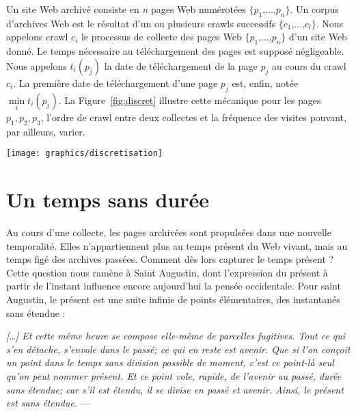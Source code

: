 \documentclass[symmetric,justified,marginals=raggedouter]{tufte-book}
\begin{document}
Un site Web archivé consiste en \textit{n} pages Web numérotées $\{p_1$,...,$p_n\}$. Un corpus d'archives Web est le résultat d'un ou plusieurs crawls successifs $\{c_1$,...,$c_l\}$. Nous appelons crawl $c_i$ le processus de collecte des pages Web $\{p_1$,...,$p_n\}$ d'un site Web donné. Le temps nécessaire au téléchargement des pages est supposé négligeable. Nous appelons $t_i(p_j)$ la date de téléchargement de la page $p_j$ au cours du crawl $c_i$. La première date de téléchargement d'une page $p_j$ est, enfin, notée $\min\limits_{i} t_i(p_j)$. La Figure~\ref{fig:discret} illustre cette mécanique pour les pages $p_1, p_2, p_3$, l'ordre de crawl entre deux collectes et la fréquence des visites pouvant, par ailleurs, varier. 

\begin{figure*}%
  \texttt{[image: graphics/discretisation]}
  \caption{Archivage (cercles bleus) des pages $p_1, p_2, p_3$ au cours de deux crawls $c_1, c_2$}
  \label{fig:discret}
\end{figure*}

\section{Un temps sans durée}
\label{sec:4_temporalite}

\noindent Au cours d'une collecte, les pages archivées sont propulsées dans une nouvelle temporalité. Elles n'ap\-partiennent plus au temps présent du Web vivant, mais au temps figé des archives passées. Comment dès lors capturer le temps présent ? Cette question nous ramène à Saint Augustin, dont l'expression du  présent à partir de l'instant influence encore aujourd'hui la pensée occidentale. Pour saint Augustin, le présent est une suite infinie de points élémentaires, des instantanés sans étendue :\\ 

\begin{fullwidth}
\og\textit{[\ldots{}] Et cette même heure se compose elle-même de parcelles fugitives. Tout ce qui s'en détache, s'envole dans le passé; ce qui en reste est avenir. Que si l'on conçoit un point dans le temps sans division possible de moment, c'est ce point-là seul qu'on peut nommer présent. Et ce point vole, rapide, de l'avenir au passé, durée sans étendue; car s'il est étendu, il se divise en passé et avenir. Ainsi, le présent est sans étendue.}\fg{} ---  \citep[livre XI, chap. XV, 20]{saint_augustin_confessions_421}\\
\end{fullwidth}
\end{document}
